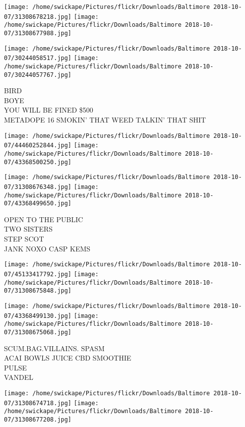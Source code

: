 \documentclass[10pt,letterpaper]{article}
\begin{document}
\texttt{[image: /home/swickape/Pictures/flickr/Downloads/Baltimore 2018-10-07/31308678218.jpg]}
\texttt{[image: /home/swickape/Pictures/flickr/Downloads/Baltimore 2018-10-07/31308677988.jpg]}

\texttt{[image: /home/swickape/Pictures/flickr/Downloads/Baltimore 2018-10-07/30244058517.jpg]}
\texttt{[image: /home/swickape/Pictures/flickr/Downloads/Baltimore 2018-10-07/30244057767.jpg]}

BIRD\\
BOYE\\
YOU WILL BE FINED \$500\\
METADOPE 16 SMOKIN' THAT WEED TALKIN' THAT SHIT
\pagebreak

\texttt{[image: /home/swickape/Pictures/flickr/Downloads/Baltimore 2018-10-07/44460252844.jpg]}
\texttt{[image: /home/swickape/Pictures/flickr/Downloads/Baltimore 2018-10-07/43368500250.jpg]}

\texttt{[image: /home/swickape/Pictures/flickr/Downloads/Baltimore 2018-10-07/31308676348.jpg]}
\texttt{[image: /home/swickape/Pictures/flickr/Downloads/Baltimore 2018-10-07/43368499650.jpg]}

OPEN TO THE PUBLIC\\
TWO SISTERS\\
STEP SCOT\\
JANK NOXO CASP KEMS
\pagebreak

\texttt{[image: /home/swickape/Pictures/flickr/Downloads/Baltimore 2018-10-07/45133417792.jpg]}
\texttt{[image: /home/swickape/Pictures/flickr/Downloads/Baltimore 2018-10-07/31308675848.jpg]}

\texttt{[image: /home/swickape/Pictures/flickr/Downloads/Baltimore 2018-10-07/43368499130.jpg]}
\texttt{[image: /home/swickape/Pictures/flickr/Downloads/Baltimore 2018-10-07/31308675068.jpg]}

SCUM.BAG.VILLAINS. SPASM\\
ACAI BOWLS JUICE CBD SMOOTHIE\\
PULSE\\
VANDEL
\pagebreak

\texttt{[image: /home/swickape/Pictures/flickr/Downloads/Baltimore 2018-10-07/31308674718.jpg]}
\texttt{[image: /home/swickape/Pictures/flickr/Downloads/Baltimore 2018-10-07/31308677208.jpg]}
\end{document}
